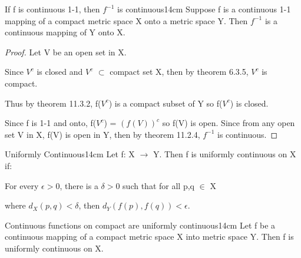     \vspace{0.5cm}



    \begin{wtheorem}{If f is continuous 1-1, then $f^{-1}$ is continuous}{14cm}
        Suppose f is a continuous 1-1 mapping of a compact metric space X
        onto a metric space Y.
        Then $f^{-1}$ is a continuous mapping of Y onto X.
    \end{wtheorem}

    \begin{proof}
        Let V be an open set in X.

        Since $V^c$ is closed and $V^c$ $\subset$ compact set X,
        then by {\color{red} theorem 6.3.5}, $V^c$ is compact.

        Thus by {\color{red} theorem 11.3.2}, f($V^c$) is a compact
        subset of Y so f($V^c$) is closed.

        Since f is 1-1 and onto, f($V^c$) = $(f(V))^c$ so f(V) is open.
        Since from any open set V in X, f(V) is open in Y, then by
        {\color{red} theorem 11.2.4}, $f^{-1}$ is continuous.
    \end{proof}

    \newpage



    \begin{definition}{Uniformly Continuous}{14cm}
        Let f: X $\rightarrow$ Y. Then f is uniformly continuous on X if:
        
        \begin{adjustbox}{minipage=13cm, right, vspace=0.1cm 0cm}
            For every $\epsilon > 0$, there is a $\delta > 0$
            such that for all p,q $\in$ X
            
            where $d_X(p,q) < \delta$, then
            $d_Y(f(p),f(q)) < \epsilon$.
        \end{adjustbox}
    \end{definition}

    \vspace{0.5cm}



    \begin{wtheorem}{Continuous functions on compact are uniformly continuous}{14cm}
        Let f be a continuous mapping of a compact metric space X into
        metric space Y.
        Then f is uniformly continuous on X.
    \end{wtheorem}

